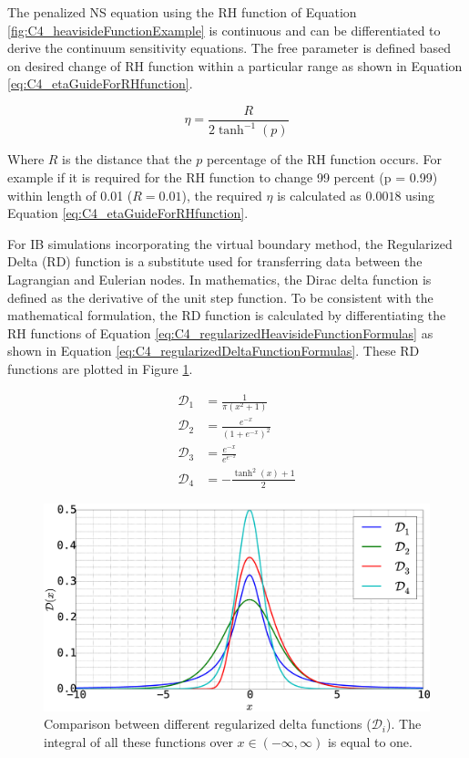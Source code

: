 The penalized NS equation using the RH function of Equation \eqref{fig:C4_heavisideFunctionExample} is continuous and can be differentiated to derive the continuum sensitivity equations. The free parameter is defined based on desired change of RH function within a particular range as shown in Equation \eqref{eq:C4_etaGuideForRHfunction}.

\begin{equation}\label{eq:C4_etaGuideForRHfunction}
    \eta = \frac{R}{2 \tanh^{-1} (p)}
\end{equation}

Where $R$ is the distance that the $p$ percentage of the RH function occurs. For example if it is required for the RH function to change 99 percent (p = 0.99) within length of 0.01 ($R = 0.01$), the required $\eta$ is calculated as $0.0018$ using Equation \eqref{eq:C4_etaGuideForRHfunction}.

For IB simulations incorporating the virtual boundary method, the Regularized Delta (RD) function is a substitute used for transferring data between the Lagrangian and Eulerian nodes. In mathematics, the Dirac delta function is defined as the derivative of the unit step function. To be consistent with the mathematical formulation, the RD function is calculated by differentiating the RH functions of Equation \eqref{eq:C4_regularizedHeavisideFunctionFormulas} as shown in Equation \eqref{eq:C4_regularizedDeltaFunctionFormulas}. These RD functions are plotted in Figure \ref{fig:C4_deltaFunctionExample}.

\begin{subequations}\label{eq:C4_regularizedDeltaFunctionFormulas}
\begin{align}
    \mathcal{D}_1 &= \frac{1}{\pi \left(x^{2} + 1\right)} \\
    \mathcal{D}_2 &= \frac{e^{- x}}{\left(1 + e^{- x}\right)^{2}} \\
    \mathcal{D}_3 &= \frac{e^{- x}}{e^{e^{- x}}} \\
    \mathcal{D}_4 &= - \frac{\tanh^{2}{\left (x \right )} + 1}{2}
\end{align}
\end{subequations}

\begin{figure}[H]
    \centering
    \includegraphics[width=12.00cm]{Chapter_4/figure/delta_function_example.eps}
    \caption{Comparison between different regularized delta functions ($\mathcal{D}_i$). The integral of all these functions over $x\in(-\infty, \infty)$ is equal to one.}
    \label{fig:C4_deltaFunctionExample}
\end{figure}

